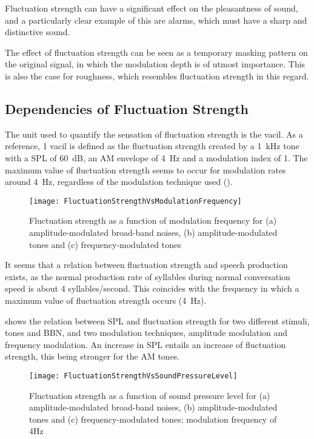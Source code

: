 \documentclass[../main.tex]{subfiles}
\begin{document}
\begin{theoreticalbackground}
Fluctuation strength can have a significant effect on the pleasantness of sound,
and a particularly clear example of this are alarms, which must have a sharp and
distinctive sound.

The effect of fluctuation strength can be seen as a temporary masking pattern on
the original signal, in which the modulation depth is of utmost importance. This
is also the case for roughness, which resembles fluctuation strength in this
regard.

\subsection{Dependencies of Fluctuation Strength}

The unit used to quantify the sensation of fluctuation strength is the vacil. As
a reference, 1 vacil is defined as the fluctuation strength created by a 1~kHz
tone with a \gls{SPL} of 60~dB, an \gls{AM} envelope of 4~Hz and a modulation
index of 1. The maximum value of fluctuation strength seems to occur for
modulation rates around 4~Hz, regardless of the modulation technique used
().

\begin{figure}[!ht]
  \centering
  \texttt{[image: FluctuationStrengthVsModulationFrequency]}
  \caption{Fluctuation strength as a function of modulation frequency for (a)
    amplitude-modulated broad-band noises, (b) amplitude-modulated tones and (c)
    frequency-modulated tones~\cite[pp.~248]{Fastl2007Psychoacoustics}}
\label{fig:flucstrenvmodfreq}
\end{figure}

It seems that a relation between fluctuation strength and speech production
exists, as the normal production rate of syllables during normal conversation
speed is about 4 syllables/second. This coincides with the frequency in which a
maximum value of fluctuation strength occurs (4~Hz).

 shows the relation between \gls{SPL} and
fluctuation strength for two different stimuli, tones and \gls{BBN}, and two
modulation techniques, amplitude modulation and frequency modulation. An
increase in \gls{SPL} entails an increase of fluctuation strength, this being
stronger for the \gls{AM} tones.

\begin{figure}[!ht]
  \centering
  \texttt{[image: FluctuationStrengthVsSoundPressureLevel]}
  \caption{Fluctuation strength as a function of sound pressure level for (a)
    amplitude-modulated broad-band noises, (b) amplitude-modulated tones and (c)
    frequency-modulated tones; modulation frequency of
    4Hz~\cite[pp.~249]{Fastl2007Psychoacoustics}}
\label{fig:flucstrenvsndpreslvl}
\end{figure}


\end{theoreticalbackground}
\end{document}
